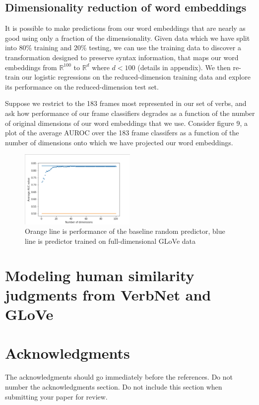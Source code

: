 \documentclass[11pt,a4paper]{article}
\begin{document}
\subsection{Dimensionality reduction of word embeddings}
It is possible to make predictions from our word embeddings that are nearly as good using only a fraction of the dimensionality. Given data which we have split into 80\% training and 20\% testing, we can use the training data to discover a transformation designed to preserve syntax information, that maps our word embeddings from $\mathbb{R}^{100}$ to $\mathbb{R}^d$ where $d < 100$ (details in appendix). We then re-train our logistic regressions on the reduced-dimension training data and explore its performance on the reduced-dimension test set. 

Suppose we restrict to the 183 frames most represented in our set of verbs, and ask how performance of our frame classifiers degrades as a function of the number of original dimensions of our word embeddings that we use. Consider figure 9, a plot of the average AUROC over the 183 frame classifers as a function of the number of dimensions onto which we have projected our word embeddings. 

\begin{figure}
	\centering
	\includegraphics[width=0.5\textwidth]{aucbydimension.png}
	\caption{\label{fig:frog} Orange line is performance of the baseline random predictor, blue line is predictor trained on full-dimensional GLoVe data}
\end{figure}

 
\section{Modeling human similarity judgments from VerbNet and GLoVe}

\section*{Acknowledgments}

The acknowledgments should go immediately before the references.  Do
not number the acknowledgments section. Do not include this section
when submitting your paper for review.
\end{document}
